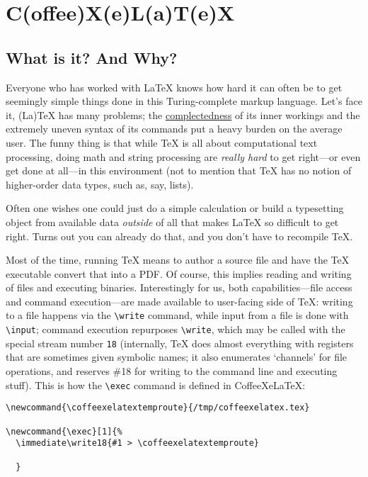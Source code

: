 \section{C(offee)X(e)L(a)T(e)X}\label{coffeexelatex}

\subsection{What is it? And Why?}\label{what-is-it-and-why}

Everyone who has worked with LaTeX knows how hard it can often be to get
seemingly simple things done in this Turing-complete markup language.
Let's face it, (La)TeX has many problems; the
\href{http://www.infoq.com/presentations/Simple-Made-Easy}{complectedness}
of its inner workings and the extremely uneven syntax of its commands
put a heavy burden on the average user. The funny thing is that while
TeX is all about computational text processing, doing math and string
processing are \emph{really hard} to get right---or even get done at
all---in this environment (not to mention that TeX has no notion of
higher-order data types, such as, say, lists).

Often one wishes one could just do a simple calculation or build a
typesetting object from available data \emph{outside} of all that makes
LaTeX so difficult to get right. Turns out you can already do that, and
you don't have to recompile TeX.

Most of the time, running TeX means to author a source file and have the
TeX executable convert that into a PDF. Of course, this implies reading
and writing of files and executing binaries. Interestingly for us, both
capabilities---file access and command execution---are made available to
user-facing side of TeX: writing to a file happens via the
\texttt{\textbackslash{}write} command, while input from a file is done
with \texttt{\textbackslash{}input}; command execution repurposes
\texttt{\textbackslash{}write}, which may be called with the special
stream number \texttt{18} (internally, TeX does almost everything with
registers that are sometimes given symbolic names; it also enumerates
`channels' for file operations, and reserves \#18 for writing to the
command line and executing stuff). This is how the
\texttt{\textbackslash{}exec} command is defined in CoffeeXeLaTeX:

\begin{verbatim}
\newcommand{\coffeexelatextemproute}{/tmp/coffeexelatex.tex}

\newcommand{\exec}[1]{%
  \immediate\write18{#1 > \coffeexelatextemproute}
  
  }
\end{verbatim}

